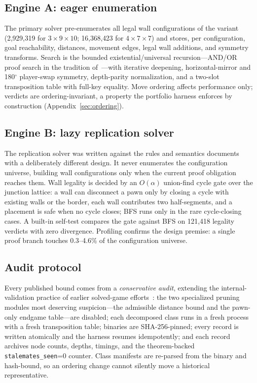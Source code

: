 \documentclass[conference]{IEEEtran}
\newcommand{\varSpec}[3]{$#1{\times}#2{\times}#3$}
\begin{document}
\subsection{Engine A: eager enumeration}

The primary solver pre-enumerates all legal wall configurations of the variant (2{,}929{,}319 for \varSpec{3}{9}{10}; 16{,}368{,}423 for \varSpec{4}{7}{7}) and stores, per configuration, goal reachability, distances, movement edges, legal wall additions, and symmetry transforms. Search is the bounded existential/universal recursion---AND/OR proof search in the tradition of~\cite{allis1994proof,allis1994searching}---with iterative deepening, horizontal-mirror and 180$^\circ$ player-swap symmetry, depth-parity normalization, and a two-slot transposition table with full-key equality. Move ordering affects performance only; verdicts are ordering-invariant, a property the portfolio harness enforces by construction (Appendix~\ref{sec:ordering}).

\subsection{Engine B: lazy replication solver}

The replication solver was written against the rules and semantics documents with a deliberately different design. It never enumerates the configuration universe, building wall configurations only when the current proof obligation reaches them. Wall legality is decided by an $O(\alpha)$ union-find cycle gate over the junction lattice: a wall can disconnect a pawn only by closing a cycle with existing walls or the border, each wall contributes two half-segments, and a placement is safe when no cycle closes; BFS runs only in the rare cycle-closing cases. A built-in self-test compares the gate against BFS on 121{,}418 legality verdicts with zero divergence. Profiling confirms the design premise: a single proof branch touches 0.3--4.6\% of the configuration universe.

\subsection{Audit protocol}

Every published bound comes from a \emph{conservative audit}, extending the internal-validation practice of earlier solved-game efforts~\cite{schaeffer2007checkers,romein2003solving}: the two specialized pruning modules most deserving suspicion---the admissible distance bound and the pawn-only endgame table---are disabled; each decomposed class runs in a fresh process with a fresh transposition table; binaries are SHA-256-pinned; every record is written atomically and the harness resumes idempotently; and each record archives node counts, depths, timings, and the theorem-backed \texttt{stalemates\_seen}=0 counter. Class manifests are re-parsed from the binary and hash-bound, so an ordering change cannot silently move a historical representative.
\end{document}

